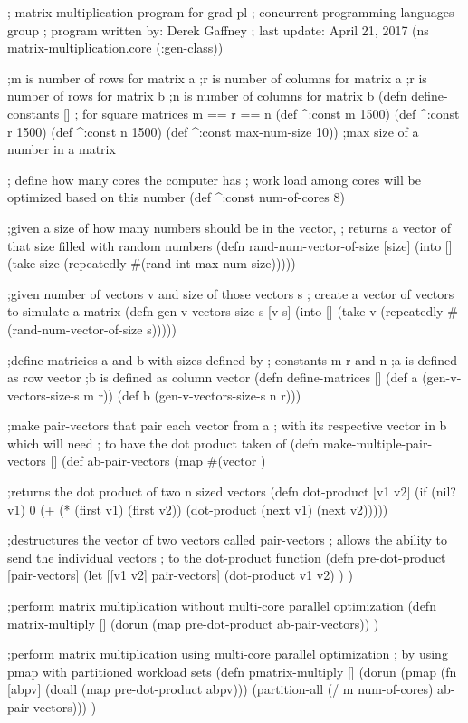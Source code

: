 ; matrix multiplication program for grad-pl
; concurrent programming languages group
; program written by: Derek Gaffney
; last update: April 21, 2017
(ns matrix-multiplication.core
  (:gen-class))

;m is number of rows for matrix a
;r is number of columns for matrix a
;r is number of rows for matrix b
;n is number of columns for matrix b
(defn define-constants
  []
  ; for square matrices m == r == n
  (def ^:const m 1500)
  (def ^:const r 1500)
  (def ^:const n 1500)
  (def ^:const max-num-size 10)) ;max size of a number in a matrix

; define how many cores the computer has
; work load among cores will be optimized based on this number
(def ^:const num-of-cores 8)

;given a size of how many numbers should be in the vector,
; returns a vector of that size filled with random numbers
(defn rand-num-vector-of-size
  [size]
  (into [] (take size (repeatedly #(rand-int max-num-size)))))

;given number of vectors v and size of those vectors s
; create a vector of vectors to simulate a matrix
(defn gen-v-vectors-size-s
  [v s]
  (into [] (take v (repeatedly #(rand-num-vector-of-size s)))))

;define matricies a and b with sizes defined by
; constants m r and n
;a is defined as row vector
;b is defined as column vector
(defn define-matrices
  []
  (def a (gen-v-vectors-size-s m r))
  (def b (gen-v-vectors-size-s n r)))

;make pair-vectors that pair each vector from a
; with its respective vector in b which will need
; to have the dot product taken of
(defn make-multiple-pair-vectors
  []
  (def ab-pair-vectors (map #(vector %
  )

;returns the dot product of two n sized vectors
(defn dot-product
  [v1 v2]
  (if (nil? v1)
    0
    (+ (* (first v1) (first v2)) (dot-product (next v1) (next v2)))))

;destructures the vector of two vectors called pair-vectors
; allows the ability to send the individual vectors
; to the dot-product function
(defn pre-dot-product
  [pair-vectors]
  (let [[v1 v2] pair-vectors]
    (dot-product v1 v2)
    )
  )

;perform matrix multiplication without multi-core parallel optimization
(defn matrix-multiply
  []
  (dorun (map pre-dot-product ab-pair-vectors))
  )

;perform matrix multiplication using multi-core parallel optimization
; by using pmap with partitioned workload sets
(defn pmatrix-multiply
  []
  (dorun (pmap (fn [abpv] (doall (map pre-dot-product abpv))) (partition-all (/ m num-of-cores)  ab-pair-vectors)))
  )

